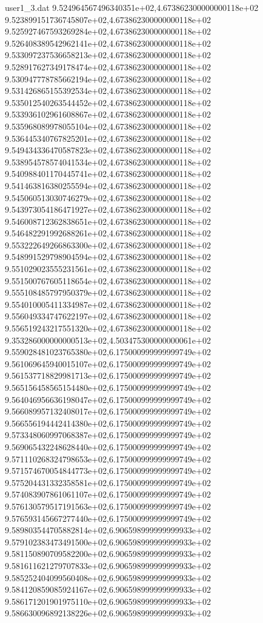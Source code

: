 \begin{filecontents}{user1_3.dat}
9.524964567496340351e+02,4.673862300000000118e+02
9.523899151736745807e+02,4.673862300000000118e+02
9.525927467593269284e+02,4.673862300000000118e+02
9.526408389542962141e+02,4.673862300000000118e+02
9.533097237536658213e+02,4.673862300000000118e+02
9.528917627349178474e+02,4.673862300000000118e+02
9.530947778785662194e+02,4.673862300000000118e+02
9.531426865155392534e+02,4.673862300000000118e+02
9.535012540263544452e+02,4.673862300000000118e+02
9.533936102961608867e+02,4.673862300000000118e+02
9.535968089978055104e+02,4.673862300000000118e+02
9.536445340767825201e+02,4.673862300000000118e+02
9.549434336470587823e+02,4.673862300000000118e+02
9.538954578574041534e+02,4.673862300000000118e+02
9.540988401170445741e+02,4.673862300000000118e+02
9.541463816380255594e+02,4.673862300000000118e+02
9.545060513030746279e+02,4.673862300000000118e+02
9.543973054186471927e+02,4.673862300000000118e+02
9.546008712362838651e+02,4.673862300000000118e+02
9.546482291992688261e+02,4.673862300000000118e+02
9.553222649266863300e+02,4.673862300000000118e+02
9.548991529798904594e+02,4.673862300000000118e+02
9.551029023555231561e+02,4.673862300000000118e+02
9.551500767605118654e+02,4.673862300000000118e+02
9.555108485797950379e+02,4.673862300000000118e+02
9.554010005411334987e+02,4.673862300000000118e+02
9.556049334747622197e+02,4.673862300000000118e+02
9.556519243217551320e+02,4.673862300000000118e+02
9.353286000000000513e+02,4.503475300000000061e+02
9.559028481023765380e+02,6.175000999999999749e+02
9.561069645940015107e+02,6.175000999999999749e+02
9.561537718829981713e+02,6.175000999999999749e+02
9.565156458565154480e+02,6.175000999999999749e+02
9.564046956636198047e+02,6.175000999999999749e+02
9.566089957132408017e+02,6.175000999999999749e+02
9.566556194442414380e+02,6.175000999999999749e+02
9.573348060997068387e+02,6.175000999999999749e+02
9.569065432248628440e+02,6.175000999999999749e+02
9.571110268324798653e+02,6.175000999999999749e+02
9.571574670054844773e+02,6.175000999999999749e+02
9.575204431332358581e+02,6.175000999999999749e+02
9.574083907861061107e+02,6.175000999999999749e+02
9.576130579517191563e+02,6.175000999999999749e+02
9.576593145667277440e+02,6.175000999999999749e+02
9.589803544705882814e+02,6.906598999999999933e+02
9.579102383473491500e+02,6.906598999999999933e+02
9.581150890709582200e+02,6.906598999999999933e+02
9.581611621279707833e+02,6.906598999999999933e+02
9.585252404099560408e+02,6.906598999999999933e+02
9.584120859085924167e+02,6.906598999999999933e+02
9.586171201901975110e+02,6.906598999999999933e+02
9.586630096892138226e+02,6.906598999999999933e+02

\end{filecontents}
